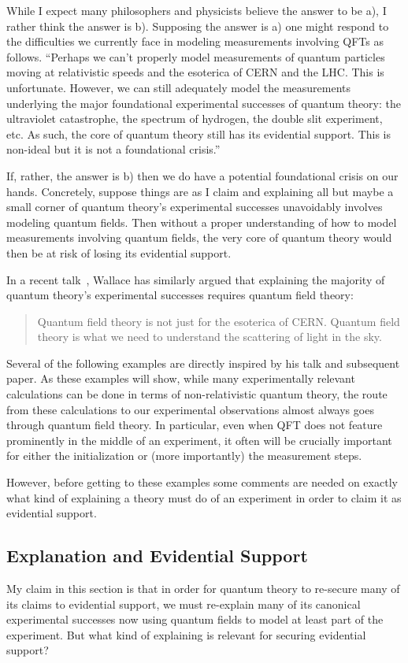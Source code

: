\documentclass[prd,twocolumn,superscriptaddress,floatfix,amsmath,amssymb,amsfonts,nofootinbib]{revtex4-2}
\begin{document}
While I expect many philosophers and physicists believe the answer to be a), I rather think the answer is b). Supposing the answer is a) one might respond to the difficulties we currently face in modeling measurements involving QFTs as follows. ``Perhaps we can't properly model measurements of quantum particles moving at relativistic speeds and the esoterica of CERN and the LHC. This is unfortunate. However, we can still adequately model the measurements underlying the major foundational experimental successes of quantum theory: the ultraviolet catastrophe, the spectrum of hydrogen, the double slit experiment, etc. As such, the core of quantum theory still has its evidential support. This is non-ideal but it is not a foundational crisis.'' 

If, rather, the answer is b) then we do have a potential foundational crisis on our hands. Concretely, suppose things are as I claim and explaining all but maybe a small corner of quantum theory's experimental successes unavoidably involves modeling quantum fields. Then without a proper understanding of how to model measurements involving quantum fields, the very core of quantum theory would then be at risk of losing its evidential support.

In a recent talk~\cite{WallaceBlueSkyTalk}, Wallace has similarly argued that explaining the majority of quantum theory's experimental successes requires quantum field theory: 
\begin{quote}
    Quantum field theory is not just for the esoterica of CERN. Quantum field theory is what we need to understand the scattering of light in the sky.
\end{quote}
Several of the following examples are directly inspired by his talk and subsequent paper\cite{WallaceBlueSkyPaper}. As these examples will show, while many experimentally relevant calculations can be done in terms of non-relativistic quantum theory, the route from these calculations to our experimental observations almost always goes through quantum field theory. In particular, even when QFT does not feature prominently in the middle of an experiment, it often will be crucially important for either the initialization or (more importantly) the measurement steps.

However, before getting to these examples some comments are needed on exactly what kind of explaining a theory must do of an experiment in order to claim it as evidential support.

\subsection{Explanation and Evidential Support}\label{Standards}
My claim in this section is that in order for quantum theory to re-secure many of its claims to evidential support, we must re-explain many of its canonical experimental successes now using quantum fields to model at least part of the experiment. But what kind of explaining is relevant for securing evidential support?
\end{document}
